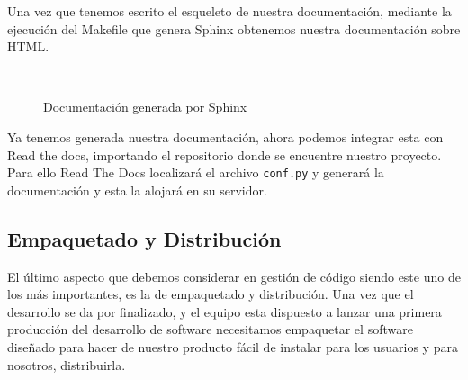 Una vez que tenemos escrito el esqueleto de nuestra documentación, mediante la ejecución del Makefile que genera Sphinx obtenemos nuestra documentación sobre HTML.

\begin{figure}[H]
    \centering
    \\
    \caption{Documentación generada por Sphinx}
    \label{fig:sphinx}
\end{figure}

Ya tenemos generada nuestra documentación, ahora podemos integrar esta con Read the docs, importando el repositorio donde se encuentre nuestro proyecto. Para ello Read The Docs localizará el archivo \texttt{conf.py} y generará la documentación y esta la alojará en su servidor. 


\subsection*{Empaquetado y Distribución}

El último aspecto que debemos considerar en gestión de código siendo este uno de los más importantes, es la de empaquetado y distribución. Una vez que el desarrollo se da por finalizado, y el equipo esta dispuesto a lanzar una primera producción del desarrollo de software necesitamos empaquetar el software diseñado para hacer de nuestro producto fácil de instalar para los usuarios y para nosotros, distribuirla. 


